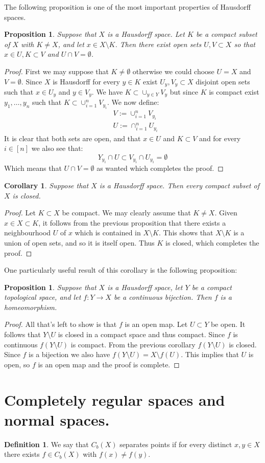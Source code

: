 \documentclass[11pt,a4paper]{article}
\theoremstyle{definition}
\newtheorem{definition}{Definition}[section]
\theoremstyle{plain}
\newtheorem{proposition}[theorem]{Proposition}
\newtheorem{corollary}[theorem]{Corollary}
\begin{document}
	The following proposition is one of the most important properties of
	Hausdorff spaces.
	\begin{proposition}
		Suppose that $X$ is a Hausdorff space. Let $K$ be a compact subset
		of $X$ with $K \neq X$, and let $x \in X \setminus K$. Then there 	
		exist open sets $U, V \subset X$ so that $x \in U , K \subset V$ 
		and $U \cap V = \emptyset$.
	\end{proposition}
	\begin{proof}
		First we may suppose that $K \neq \emptyset$ otherwise we could
		choose $U = X$ and $V = \emptyset$. Since $X$ is Hausdorff for
		every $y \in K$ exist $U_y, V_y \subset X$ disjoint open sets 
		such that $x \in U_y$ and $y \in V_y$. We have 
		$K \subset \cup_{y \in Y}{V_y}$ but since $K$ is compact exist
		$y_1,\dots,y_n$ such that $K \subset \cup_{i=1}^{n}{V_{y_i}}$.
		We now define:
		\begin{align*}
			&V := \cup_{i=1}^{n}{V_{y_i}} \\
			&U := \cap_{i=1}^{n}{U_{y_i}}
		\end{align*}
		It is clear that both sets are open, and that $x \in U$ and
		$K \subset V$ and for every $i \in [n]$ we also see that:
		\[
			Y_{y_i} \cap U \subset V_{y_i} \cap U_{y_i} = \emptyset
		\]
		Which means that $U \cap V = \emptyset$ as wanted which completes
		the proof.
	\end{proof}
	\begin{corollary}
		Suppose that $X$ is a Hausdorff space. Then every compact subset
		of $X$ is closed.
	\end{corollary}
	\begin{proof}
		Let $K \subset X$ be compact. We may clearly assume that 
		$K \neq X$. Given $x \in X \subset K$, it follows from the previous
		proposition that there exists a neighbourhood $U$ of $x$ which is 
		contained in $X \setminus K$. This shows that $X \setminus K$ is a 
		union of open sets, and so it is itself open. Thus $K$ is 
		closed, which completes the proof. 
	\end{proof}
	One particularly useful result of this corollary is the following
	proposition:
	\begin{proposition}
		Suppose that $X$ is a Hausdorff space, let $Y$ be a compact 
		topological space, and let $f \colon Y \to X$ be a continuous 
		bijection. Then $f$ is a homeomorphism.
	\end{proposition}
	\begin{proof}
		All that's left to show is that $f$ is an open map. Let $U \subset Y$
		be open. It follows that $Y \setminus U$ is closed in a compact space
		and thus compact. Since $f$ is continuous $f(Y \setminus U)$ is
		compact. From the previous corollary $f(Y \setminus U)$ is closed.
		Since $f$ is a bijection we also have 
		$f(Y \setminus U) = X \setminus f(U)$. This implies that $U$ is open,
		so $f$ is an open map and the proof is complete.
	\end{proof}
	
	\newpage
	
	\section{Completely regular spaces and normal spaces.}
	\begin{definition}
		We say that $C_b(X)$ separates points if for every distinct 
		$x, y \in X$ there exists $f \in C_b(X)$ with $f(x) \neq f(y)$.
	\end{definition}
	
	
	
	
	
\end{document}
